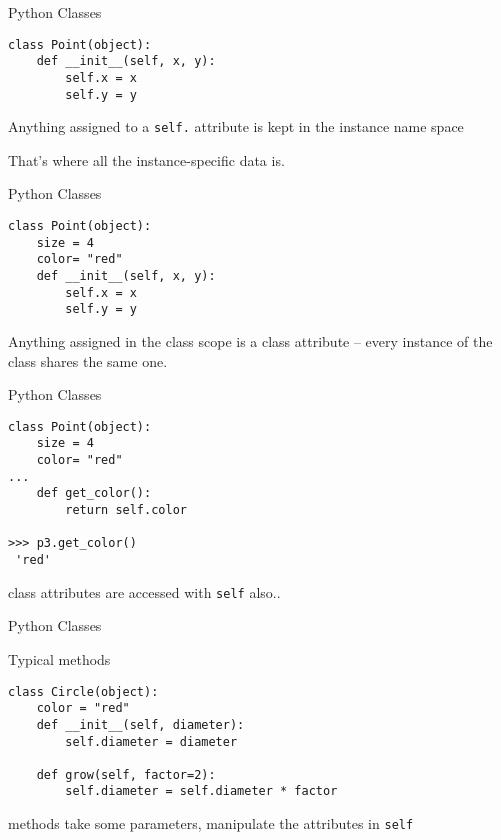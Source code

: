 \documentclass{beamer}
\begin{document}
\begin{frame}[fragile]{Python Classes}

\begin{verbatim}
class Point(object):
    def __init__(self, x, y):
        self.x = x
        self.y = y
\end{verbatim}

\vfill
{\Large Anything assigned to a \verb|self.| attribute is kept in the instance
name space}

\vfill
{\Large That's where all the instance-specific data is.}

\vfill
\end{frame} 

\begin{frame}[fragile]{Python Classes}

\begin{verbatim}
class Point(object):
    size = 4
    color= "red"
    def __init__(self, x, y):
        self.x = x
        self.y = y
\end{verbatim}

\vfill
{\Large Anything assigned in the class scope is a class attribute -- every
instance of the class shares the same one.}
\vfill
\end{frame} 

\begin{frame}[fragile]{Python Classes}

\begin{verbatim}
class Point(object):
    size = 4
    color= "red"
...
    def get_color():
        return self.color

>>> p3.get_color()
 'red'
\end{verbatim}

\vfill
{\Large class attributes are accessed with \verb|self| also..} 
\vfill
\end{frame} 


\begin{frame}[fragile]{Python Classes}

{\Large Typical methods}
\begin{verbatim}
class Circle(object):
    color = "red"
    def __init__(self, diameter):
        self.diameter = diameter

    def grow(self, factor=2):
        self.diameter = self.diameter * factor
\end{verbatim}

\vfill
{\Large methods take some parameters, manipulate the attributes in \verb|self|} 

\end{frame} 
\end{document}
